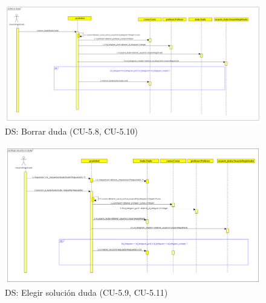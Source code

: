 \begin{figure}[H] %
\centering
\includegraphics[scale=0.2]{imagenes/diagramas/secuencia/analisis/borrar_duda.png}  %

\caption{DS: Borrar duda (CU-5.8, CU-5.10) }\label{figura89}

\end{figure}

\begin{figure}[H] %
\centering
\includegraphics[scale=0.2]{imagenes/diagramas/secuencia/analisis/elegir_solucion_mi_duda.png}  %

\caption{DS: Elegir solución duda (CU-5.9, CU-5.11) }\label{figura90}

\end{figure}


